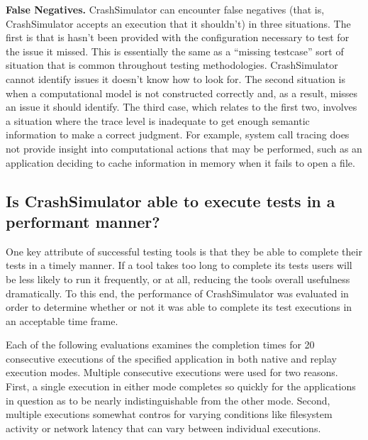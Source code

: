 {\bf False Negatives.}
CrashSimulator can encounter false negatives (that is, CrashSimulator accepts an
execution that it shouldn't) in three situations.  The first is that is hasn't
been provided with the configuration necessary to test for the issue it missed.
This is essentially the same as a ``missing testcase'' sort of situation that is
common throughout testing methodologies.  CrashSimulator cannot identify issues
it doesn't know how to look for.  The second situation is when a computational
model is not constructed correctly and, as a result, misses an issue it should
identify.  The third case, which relates to the first two, involves a situation
where the trace level is inadequate to get enough semantic information to 
make a correct judgment.  For example, system call tracing does not provide
insight into computational actions that may be performed, such as an 
application deciding to cache information in memory when it fails to open a 
file.

\subsection{Is CrashSimulator able to execute tests in a performant manner?}


One key attribute of successful testing tools is that they be able to complete their tests in a timely manner.
If a tool takes too long to complete its tests users will be less likely to run it frequently, or at all,
reducing the tools overall usefulness dramatically. To this end, the performance of CrashSimulator was evaluated
in order to determine whether or not it was able to complete its test executions in an acceptable time frame.

Each of the following evaluations examines the completion times for 20 consecutive executions of the specified
application in both native and replay execution modes.  Multiple consecutive executions were used for two
reasons.  First, a single execution in either mode completes so quickly for the applications in question as to
be nearly indistinguishable from the other mode.  Second, multiple executions somewhat contros for varying
conditions like filesystem activity or network latency that can vary between individual executions.


